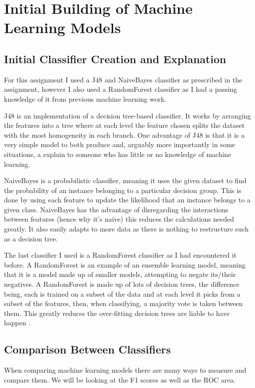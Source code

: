\section{Initial Building of Machine Learning Models}
\subsection{Initial Classifier Creation and Explanation}
For this assignment I used a J48 and NaiveBayes classifier as prescribed in the assignment, however I also used a RandomForest classifier as I had a passing knowledge of it from previous machine learning work. 

J48 is an implementation of a decision tree-based classifier. It works by arranging the features into a tree where at each level the feature chosen splits the dataset with the most homogeneity in each branch. One advantage of J48 is that it is a very simple model to both produce and, arguably more importantly in some situations, a explain to someone who has little or no knowledge of machine learning.

NaiveBayes is a probabilistic classifier, meaning it uses the given dataset to find the probability of an instance belonging to a particular decision group. This is done by using each feature to update the likelihood that an instance belongs to a given class. NaiveBayes has the advantage of disregarding the interactions between features (hence why it's naive) this reduces the calculations needed greatly. It also easily adapts to more data as there is nothing to restructure such as a decision tree.

The last classifier I used is a RandomForest classifier as I had encountered it before. A RandomForest is an example of an ensemble learning model, meaning that it is a model made up of smaller models, attempting to negate its/their negatives. A RandomForest is made up of lots of decision trees, the difference being, each is trained on a subset of the data and at each level it picks from a subset of the features, then, when classifying, a majority vote is taken between them. This greatly reduces the over-fitting decision trees are liable to have happen \cite{liaw2002}.

\subsection{Comparison Between Classifiers}
When comparing machine learning models there are many ways to measure and compare them. We will be looking at the F1 scores as well as the ROC area.

